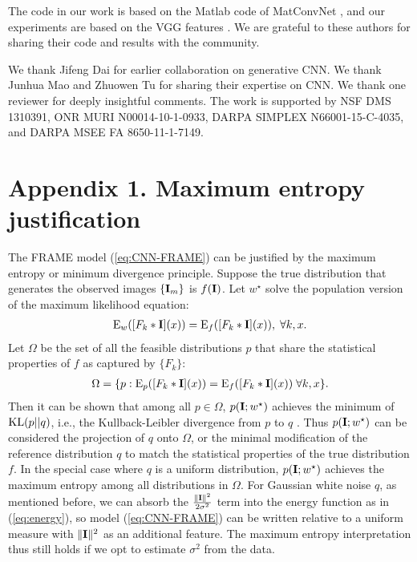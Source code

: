 \documentclass[letterpaper]{article}
\def\E{{\rm E}}
\def\I{{\bf I}}
\begin{document}
The code in our work is based on the Matlab code of MatConvNet \citep{matconvnn}, and our experiments are based on the VGG features \citep{simonyan2014very}. We are grateful to these authors for sharing their code and results with the community. 

We thank Jifeng Dai for earlier collaboration on generative CNN. We thank Junhua Mao and Zhuowen Tu for sharing their expertise on CNN.  We thank one reviewer for deeply insightful comments. The work is supported by NSF DMS 1310391, ONR MURI N00014-10-1-0933, DARPA SIMPLEX  N66001-15-C-4035,  and DARPA MSEE   FA 8650-11-1-7149. 


\section*{Appendix 1.  Maximum entropy justification}

The FRAME model (\ref{eq:CNN-FRAME})  can be justified by the maximum entropy or minimum divergence principle. Suppose the true distribution that generates the observed images $\{\I_m\}$ is $f(\I)$. Let $w^{\star}$ solve  the population version of the maximum likelihood equation: 
\begin{eqnarray}
\E_{w}([F_k*\I](x)) = \E_{f}([F_k*\I](x)), \;\forall k, x. 
\end{eqnarray}
 Let $\Omega$ be the set of all the feasible distributions $p$ that share the statistical properties of $f$ as captured by $\{F_k\}$:
 \begin{eqnarray}
\Omega = \{p:  \E_{p}([F_k*\I](x)) = \E_{f}([F_k*\I](x)) \; \forall k, x\}. 
 \end{eqnarray}
Then it can be shown that among all $p \in \Omega$, $p(\I; w^{\star})$ achieves the minimum of ${\rm KL}(p||q)$, i.e., the Kullback-Leibler divergence from $p$ to $q$ \citep{della1997inducing}. Thus $p(\I; w^{\star})$ can be considered the projection of $q$ onto $\Omega$, or the minimal modification of the reference distribution $q$ to match the statistical properties of the true distribution $f$.  In the special case where $q$ is a uniform distribution, $p(\I; w^{\star})$ achieves the maximum entropy among all distributions in $\Omega$. For Gaussian white noise $q$, as mentioned before, we can absorb the $\frac{\|\I\|^2}{2\sigma^2}$ term into the energy function as in (\ref{eq:energy}), so model (\ref{eq:CNN-FRAME}) can be written relative to a uniform measure with $\|\I\|^2$ as an additional feature. The maximum entropy interpretation thus still holds if we opt to estimate $\sigma^2$ from the data. 
 
\end{document}

